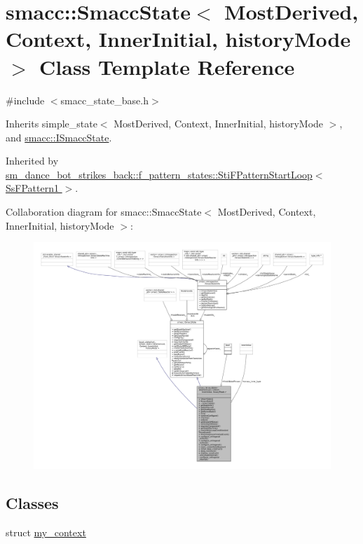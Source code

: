 \hypertarget{classsmacc_1_1SmaccState}{}\section{smacc\+:\+:Smacc\+State$<$ Most\+Derived, Context, Inner\+Initial, history\+Mode $>$ Class Template Reference}
\label{classsmacc_1_1SmaccState}


{\ttfamily \#include $<$smacc\+\_\+state\+\_\+base.\+h$>$}



Inherits simple\+\_\+state$<$ Most\+Derived, Context, Inner\+Initial, history\+Mode $>$, and \hyperlink{classsmacc_1_1ISmaccState}{smacc\+::\+I\+Smacc\+State}.



Inherited by \hyperlink{structsm__dance__bot__strikes__back_1_1f__pattern__states_1_1StiFPatternStartLoop}{sm\+\_\+dance\+\_\+bot\+\_\+strikes\+\_\+back\+::f\+\_\+pattern\+\_\+states\+::\+Sti\+F\+Pattern\+Start\+Loop$<$ Ss\+F\+Pattern1 $>$}.



Collaboration diagram for smacc\+:\+:Smacc\+State$<$ Most\+Derived, Context, Inner\+Initial, history\+Mode $>$\+:
\nopagebreak
\begin{figure}[H]
\begin{center}
\leavevmode
\includegraphics[width=350pt]{classsmacc_1_1SmaccState__coll__graph}
\end{center}
\end{figure}
\subsection*{Classes}
\begin{DoxyCompactItemize}
\item 
struct \hyperlink{structsmacc_1_1SmaccState_1_1my__context}{my\+\_\+context}
\end{DoxyCompactItemize}
